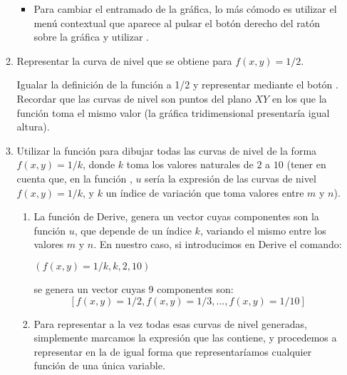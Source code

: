 \begin{enumerate}[leftmargin=*]
\begin{enumerate}
\begin{indicacion}
{\begin{enumerate}
\begin{itemize}
\item Para cambiar el entramado de la gráfica, lo más cómodo es
utilizar el menú contextual que aparece al pulsar el botón derecho
del ratón sobre la gráfica y utilizar .
\end{itemize}

\end{enumerate}

}
\end{indicacion}

  \item Representar la curva de nivel que se obtiene para
  $f(x,y)=1/2$.

\begin{indicacion}
{Igualar la definición de la función a 1/2 y representar mediante el
botón . Recordar que las curvas de nivel son
puntos del plano $XY$ en los que la función toma el mismo valor (la
gráfica tridimensional presentaría igual altura).

}
\end{indicacion}


  \item Utilizar la función  para dibujar todas las
  curvas de nivel de la forma $f(x,y) = 1/k$, donde $k$ toma los
  valores naturales de $2$ a $10$ (tener en cuenta que, en la función ,
  $u$ sería la expresión de las curvas de nivel $f(x,y) = 1/k$, y
$k$ un índice de variación que toma valores entre $m$ y $n$).

\begin{indicacion}
{

\begin{enumerate}

\item La función  de Derive, genera un
vector cuyas componentes son la función $u$, que depende de un
índice $k$, variando el mismo entre los valores $m$ y $n$. En
nuestro caso, si introducimos en Derive el comando:

\begin{center}
$(f(x,y)=1/k,k,2,10)$
\end{center}

se genera un vector cuyas 9 componentes son:
\[
[f(x,y)=1/2,f(x,y)=1/3,...,f(x,y)=1/10]
\]

\item Para representar a la vez todas esas curvas de nivel
generadas, simplemente marcamos la expresión que las contiene, y
procedemos a representar en la  de igual forma que
representaríamos cualquier función de una única variable.
\end{enumerate}

}
\end{indicacion}
\end{enumerate}
\end{enumerate}
